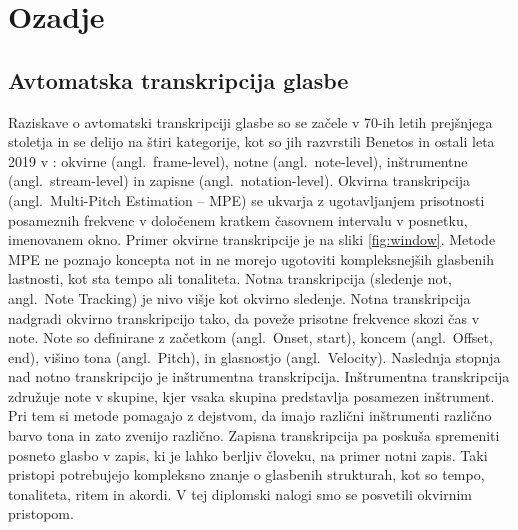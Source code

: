 \documentclass[a4paper, 12pt, openright]{book}
\newcommand{\en}{angl.}
\begin{document}
\chapter{Ozadje}
\label{ch:background}

\section{Avtomatska transkripcija glasbe}

Raziskave o avtomatski transkripciji glasbe so se začele v 70-ih letih prejšnjega stoletja in se delijo na štiri kategorije, kot so jih razvrstili Benetos in ostali leta 2019 v \cite{benetos2019overview}: okvirne (\en\ frame-level), notne (\en\ note-level), inštrumentne (\en\ stream-level) in zapisne (\en\ notation-level).
Okvirna transkripcija (\en\ Multi-Pitch Estimation -- MPE) se ukvarja z ugotavljanjem prisotnosti posameznih frekvenc v do\-lo\-če\-nem kratkem časovnem intervalu v posnetku, imenovanem okno. Primer okvirne transkripcije je na sliki \ref{fig:window}.
Metode MPE ne poznajo koncepta not in ne morejo ugotoviti kompleksnejših glasbenih lastnosti, kot sta tempo ali tonaliteta.
Notna transkripcija (sledenje not, \en\ Note Tracking) je nivo višje kot okvirno sledenje.
Notna transkripcija nadgradi okvirno transkripcijo tako, da poveže prisotne frekvence skozi čas v note.
Note so definirane z začetkom (\en\ Onset, start), koncem (\en\ Offset, end), višino tona (\en\ Pitch), in glasnostjo (\en\ Velocity).
Naslednja stopnja nad notno transkripcijo je inštrumentna transkripcija.
Inštrumentna transkripcija združuje note v skupine, kjer vsaka skupina predstavlja posamezen inštrument.
Pri tem si metode pomagajo z dejstvom, da imajo različni inštrumenti različno barvo tona in zato zvenijo različno.
Zapisna transkripcija pa poskuša spremeniti posneto glasbo v zapis, ki je lahko berljiv človeku, na primer notni zapis.
Taki pristopi potrebujejo kompleksno znanje o glasbenih strukturah, kot so tempo, tonaliteta, ritem in akordi.
V tej diplomski nalogi smo se posvetili okvirnim pristopom.
\end{document}
